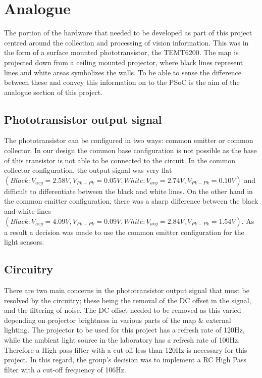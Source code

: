 \documentclass{article}
\begin{document}
\section{Analogue}

The portion of the hardware that needed to be developed as part of this project centred around the collection and processing of vision information. This was in the form of a surface mounted phototransistor, the TEMT6200. The map is projected down from a ceiling mounted projector, where black lines represent lines and white areas symbolizes the walls. To be able to sense the difference between these and convey this information on to the PSoC is the aim of the analogue section of this project.

\subsection{Phototransistor output signal}

The phototransistor can be configured in two ways: common emitter or common collector. In our design the common base configuration is not possible as the base of this transistor is not able to be connected to the circuit. In the common collector configuration, the output signal was very flat $(Black: V_{avg} = 2.58V, V_{Pk-Pk} = 0.05V, White: V_{avg} = 2.74V, V_{Pk-Pk} = 0.10V)$ and difficult to differentiate between the black and white lines. On the other hand in the common emitter configuration, there was a sharp difference between the black and white lines $(Black: V_{avg} = 4.09V, V_{Pk-Pk} = 0.09V, White: V_{avg} = 2.84V, V_{Pk-Pk} = 1.54V)$. As a result a decision was made to use the common emitter configuration for the light sensors.

\subsection{Circuitry}

There are two main concerns in the phototransistor output signal that must be resolved by the circuitry; these being the removal of the DC offset in the signal, and the filtering of noise. The DC offset needed to be removed as this varied depending on projector brightness in various parts of the map \& external lighting. The projector to be used for this project has a refresh rate of 120Hz, while the ambient light source in the laboratory has a refresh rate of 100Hz. Therefore a High pass filter with a cut-off less than 120Hz is necessary for this project. In this regard, the group's decision was to implement a RC High Pass filter with a cut-off frequency of 106Hz.
\end{document}

